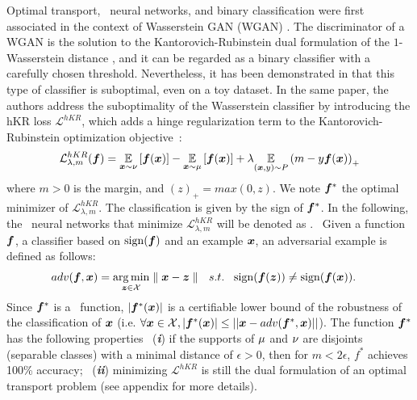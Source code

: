 Optimal transport, \onlyonelip~neural networks, and binary classification were first associated in the context of Wasserstein GAN (WGAN) \cite{Arjovsky2017}. The discriminator of a WGAN is the solution to the Kantorovich-Rubinstein dual formulation of the $1$-Wasserstein distance \cite{villani2008}, and it can be regarded as a binary classifier with a carefully chosen threshold.
Nevertheless, it has been demonstrated in \cite{serrurier2021achieving} that this type of classifier is suboptimal, even on a toy dataset. In the same paper, the authors address the suboptimality of the Wasserstein classifier by introducing the hKR loss $\mathcal{L}^{hKR}$, which adds a hinge regularization term to the Kantorovich-Rubinstein optimization objective~:
\begin{equation} \label{eq:reg_OT} 
\mathcal{L}^{hKR}_{\lambda,m}(\bm{f}) =  \underset{\bm{x} \sim \nu}{\mathbb{E}} \left[\bm{f}(\bm{x})\right]-\underset{\bm{x} \sim \mu}{\mathbb{E}}\left[\bm{f}(\bm{x})\right]  +\lambda\underset{(\bm{x}, y) \sim P}{\mathbb{E}} \left(m-y \bm{f}(\bm{x})\right)_+ 
\end{equation}
where $m>0$ is the margin, and  $(z)_+ = max(0,z)$. We note $\bm{f}^*$ 
the optimal minimizer of $\mathcal{L}^{hKR}_{\lambda,m}$. The classification is given by the sign of $\bm{f}^*$. In the following, the \onlyonelip~neural networks that minimize $\mathcal{L}^{hKR}_{\lambda,m}$ will be denoted as \otnn.
~Given a function $\bm{f}$, a classifier based on $\operatorname*{sign}(\bm{f})$ and an example $\bm{x}$, an adversarial example is defined as follows:
\begin{align}
    &adv(\bm{f}, \bm{x}) = \operatorname*{arg\,min}_{\bm{z} \in \mathcal{X}} \parallel \bm{x} -\bm{z} \parallel 
    ~~ s.t. ~~ \operatorname*{sign}(\bm{f}(\bm{z})) \neq \operatorname*{sign}(\bm{f}(\bm{x})) .
    \label{def:adversary}
\end{align}
Since $\bm{f}^*$ is a \onlyonelip~function, $|\bm{f}^*(\bm{x})|$ is a certifiable lower bound of the robustness of the classification of $\bm{x}$ 
(i.e. $\forall \bm{x} \in \mathcal{X}, |\bm{f}^*(\bm{x})|\leq ||\bm{x} - adv(\bm{f}^*,\bm{x}) || $). The function $\bm{f}^*$ has the following properties \cite{serrurier2021achieving}
~(\textbf{\textit{i}}) if the supports of $\mu$ and $\nu$ are disjoints (separable classes) with a minimal distance of $\epsilon>0$, then for $m<2\epsilon$, $f^*$ 
achieves 100\% accuracy; %
~(\textbf{\textit{ii}}) minimizing $\mathcal{L}^{hKR}$ is still the dual formulation of an optimal transport problem (see appendix for more details).

